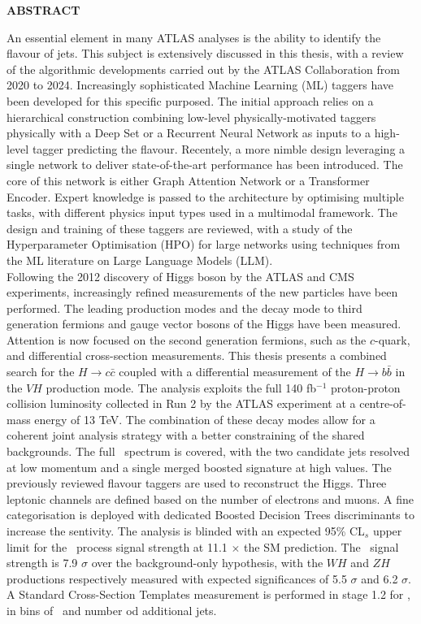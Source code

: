 
    \vspace*{\fill}
\begin{center}
\textbf{\large \color{oxfordblue} ABSTRACT}
\end{center}
An essential element in many ATLAS analyses is the ability to identify the flavour of jets. This subject is extensively discussed in this thesis, with a review of the algorithmic developments carried out by the ATLAS Collaboration from 2020 to 2024. Increasingly sophisticated Machine Learning (ML) taggers have been developed for this specific purposed. The initial approach relies on a hierarchical construction combining low-level physically-motivated taggers physically with a Deep Set or a Recurrent Neural Network as inputs to a high-level tagger predicting the flavour. Recentely, a more nimble design leveraging a single network to deliver state-of-the-art performance has been introduced. The core of this network is either Graph Attention Network or a Transformer Encoder. Expert knowledge is passed to the architecture by optimising multiple tasks, with different physics input types used in a multimodal framework. The design and training of these taggers are reviewed, with a study of the Hyperparameter Optimisation (HPO) for large networks using techniques from the ML literature on Large Language Models (LLM). \\

Following the 2012 discovery of Higgs boson by the ATLAS and CMS experiments, increasingly refined measurements of the new particles have been performed. The leading production modes and the decay mode to third generation fermions and gauge vector bosons of the Higgs have been measured. Attention is now focused on the second generation fermions, such as the $c$-quark, and differential cross-section measurements. This thesis presents a combined search for the $H \rightarrow c\bar{c}$ coupled with a differential measurement of the $H \rightarrow b\bar{b}$ in the $VH$ production mode. The analysis exploits the full 140 fb$^{-1}$ proton-proton collision luminosity collected in Run 2 by the ATLAS experiment at a centre-of-mass energy of 13 TeV. The combination of these decay modes allow for a coherent joint analysis strategy with a better constraining of the shared backgrounds. The full \pt\ spectrum is covered, with the two candidate jets resolved at low momentum and a single merged boosted signature at high values. The previously reviewed flavour taggers are used to reconstruct the Higgs. Three leptonic channels are defined based on the number of electrons and muons. A fine categorisation is deployed with dedicated Boosted Decision Trees discriminants to increase the sentivity. The analysis is blinded with an expected 95\% CL$_s$ upper limit for the \vhc\ process signal strength at 11.1 $\times$ the SM prediction. The \vhb\ signal strength is 7.9 $\sigma$ over the background-only hypothesis, with the $WH$ and $ZH$ productions respectively measured with expected significances of 5.5 $\sigma$ and 6.2 $\sigma$. A Standard Cross-Section Templates measurement is performed in stage 1.2 for \vhb, in bins of \pt\ and number od additional jets.
\vspace*{\fill}
